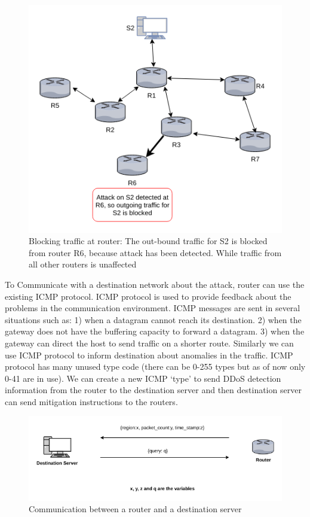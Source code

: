 \documentclass[12pt,oneside,a4paper]{article}
\begin{document}
\begin{figure}[H]
\centering
\includegraphics[scale=0.60]{mitigation_path}
\caption{Blocking traffic at router: The out-bound traffic for S2 is blocked from router R6,
because attack has been detected. While traffic from all other routers is unaffected} \label{fig:mitigation_path}
\end{figure}

To Communicate with a destination network about the attack, router can use the existing ICMP protocol. ICMP protocol is used to provide feedback about the problems in the communication environment. ICMP messages are sent in several situations such as: 1) when a datagram cannot reach its destination. 2) when the gateway does not have the buffering capacity to forward a datagram. 3) when the gateway can direct the host to send traffic on a shorter route.\cite{icmp} Similarly we can use ICMP protocol to inform destination about anomalies in the traffic. ICMP protocol has many unused type code (there can be 0-255 types but as of now only 0-41 are in use). We can create a new ICMP `type' to send DDoS detection information from the router to the destination server and then destination server can send mitigation instructions to the routers.

\begin{figure}[H]
\centering
\includegraphics[scale=0.5]{router-network-communication}
\caption{Communication between a router and a destination server} \label{fig:router-network-communication}
\end{figure}
\end{document}
